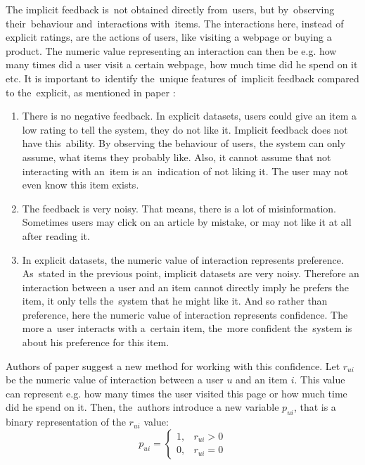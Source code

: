 The implicit feedback is~not obtained directly from~users, but by~observing their~behaviour and~interactions with~items. The interactions here, instead of explicit ratings, are the actions of users, like visiting a webpage or buying a product. The numeric value representing an interaction can then be e.g. how many times did a user visit a certain webpage, how much time did he spend on it etc. It is important to~identify the~unique features of~implicit feedback compared to the~explicit, as mentioned in paper \cite{Implicit}:
\begin{enumerate}
    \item There is no negative feedback. In explicit datasets, users could give an item a low rating to tell the system, they do not like it. Implicit feedback does not have this~ability. By observing the behaviour of users, the system can only assume, what items they probably like. Also, it cannot assume that not interacting with an~item is an~indication of not liking it. The user may not even know this item exists.

    \item The feedback is very noisy. That means, there is a lot of misinformation. Sometimes users may click on an article by mistake, or may not like it at all after reading it.
    
    \item In explicit datasets, the numeric value of interaction represents preference. As~stated in the previous point, implicit datasets are very noisy. Therefore an interaction between a user and an item cannot directly imply he prefers the item, it only tells the~system that he might like it. And so rather than preference, here the numeric value of interaction represents confidence. The more a~user interacts with a~certain item, the~more confident the~system is about his preference for this item.
\end{enumerate}
Authors of paper \cite{Implicit} suggest a new method for working with this confidence. Let $r_{ui}$ be the numeric value of interaction between a user $u$ and an item $i$. This value can represent e.g. how many times the user visited this page or how much time did he spend on it. Then, the~authors introduce a new variable $p_{ui}$, that is a binary representation of the $r_{ui}$ value:
\begin{equation} \label{eq:implicit_preference}
p_{ui} = 
\begin{cases}
    1, & r_{ui} > 0 \\
    0, & r_{ui} = 0
\end{cases}
\end{equation}
